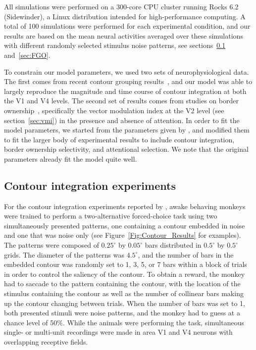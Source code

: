 All simulations were performed on a 300-core CPU cluster running Rocks 6.2 (Sidewinder), a Linux distribution intended for high-performance computing.  A total of 100 simulations were performed for each experimental condition, and our results are based on the mean neural activities averaged over these simulations with different randomly selected stimulus noise patterns, see sections~\ref{sec:contour_exp} and~\ref{sec:FGO}.

To constrain our model parameters, we used two sets of neurophysiological data. The first comes from recent contour grouping
results~\citep{Chen_etal14}, and our model was able to largely
reproduce the magnitude and time course of contour integration at both
the V1 and V4 levels. The second set of results comes from studies on
border ownership~\citep{Qiu_etal07}, specifically the vector modulation index at the V2 level (see section~\ref{sec:vmi}) in the presence and absence of attention. In order to fit the model parameters, we started from the parameters given by \cite{Mihalas_etal11b}, and modified them to fit the larger body of experimental results to include contour integration, border ownership selectivity, and attentional selection. We note that the original parameters already fit the model quite well.

\subsection{Contour integration experiments} 
\label{sec:contour_exp}

For the contour integration experiments reported by \cite{Chen_etal14}, awake behaving monkeys were trained to perform a two-alternative forced-choice task using two simultaneously presented patterns, one containing a contour embedded in noise and one that was noise only (see Figure~\ref{Fig:Contour_Results} for examples). The patterns were composed of $0.25^{\circ}$ by $0.05^{\circ}$ bars distributed in $0.5^{\circ}$ by $0.5^{\circ}$ grids. The diameter of the patterns was $4.5^{\circ}$, and the number of bars in the embedded contour was randomly set to 1, 3, 5, or 7 bars within a block of trials in order to control the saliency of the contour. To obtain a reward, the monkey had to saccade to the pattern containing the contour, with the location of the stimulus containing the contour as well as the number of collinear bars making up the contour  changing between trials.  When the number of bars was set to 1, both presented stimuli were noise patterns, and the monkey had to guess at a chance level of 50\%.  While the animals were performing the task, simultaneous single- or multi-unit recordings were made in area V1 and V4 neurons with overlapping receptive fields. 


